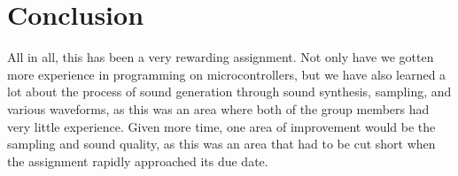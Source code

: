 \section{Conclusion}
All in all, this has been a very rewarding assignment. Not only have we gotten more experience in programming on microcontrollers, but we have also learned a lot about the process of sound generation through sound synthesis, sampling, and various waveforms, as this was an area where both of the group members had very little experience. Given more time, one area of improvement would be the sampling and sound quality, as this was an area that had to be cut short when the assignment rapidly approached its due date.


  

